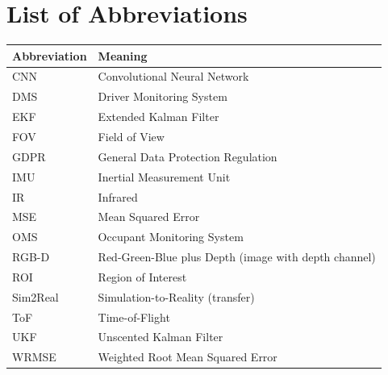 
\chapter*{List of Abbreviations}

\begin{longtable}{@{}p{3.5cm}p{10cm}@{}}
\toprule
\textbf{Abbreviation} & \textbf{Meaning} \\
\midrule
\endhead
CNN      & Convolutional Neural Network \\
DMS      & Driver Monitoring System \\
EKF      & Extended Kalman Filter \\
FOV      & Field of View \\
GDPR     & General Data Protection Regulation \\
IMU      & Inertial Measurement Unit \\
IR       & Infrared \\
MSE      & Mean Squared Error \\
OMS      & Occupant Monitoring System \\
RGB-D    & Red-Green-Blue plus Depth (image with depth channel) \\
ROI      & Region of Interest \\
Sim2Real & Simulation-to-Reality (transfer) \\
ToF      & Time-of-Flight \\
UKF      & Unscented Kalman Filter \\
WRMSE    & Weighted Root Mean Squared Error \\
\bottomrule
\end{longtable}

